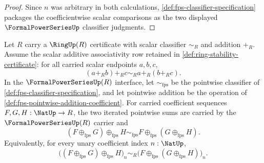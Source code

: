 \begin{proof}
Since $n$ was arbitrary in both calculations, \autoref{def:fps-classifier-specification} packages the coefficientwise scalar comparisons as the two displayed $\FormalPowerSeriesUp$ classifier judgments.
\end{proof}





\begin{theorem}
\label{thm:fps-pointwise-addition-associativity}
Let $R$ carry a $\RingUp(R)$ certificate with scalar classifier $\sim_R$ and addition $+_R$. Assume the scalar additive associativity row retained in \autoref{def:ring-stability-certificate}: for all carried scalar endpoints $a,b,c$,
$$
(a+_R b)+_R c\sim_R a+_R(b+_R c).
$$
In the $\FormalPowerSeriesUp(R)$ interface, let $\sim_{\mathrm{fps}}$ be the pointwise classifier of \autoref{def:fps-classifier-specification}, and let pointwise addition be the operation of \autoref{def:fps-pointwise-addition-coefficient}. For carried coefficient sequences $F,G,H:\NatUp\to R$, the two iterated pointwise sums are carried by the $\FormalPowerSeriesUp(R)$ carrier and
$$
(F\oplus_{\mathrm{fps}}G)\oplus_{\mathrm{fps}}H
\sim_{\mathrm{fps}}
F\oplus_{\mathrm{fps}}(G\oplus_{\mathrm{fps}}H).
$$
Equivalently, for every unary coefficient index $n:\NatUp$,
$$
\bigl((F\oplus_{\mathrm{fps}}G)\oplus_{\mathrm{fps}}H\bigr)_n
\sim_R
\bigl(F\oplus_{\mathrm{fps}}(G\oplus_{\mathrm{fps}}H)\bigr)_n.
$$
\end{theorem}
